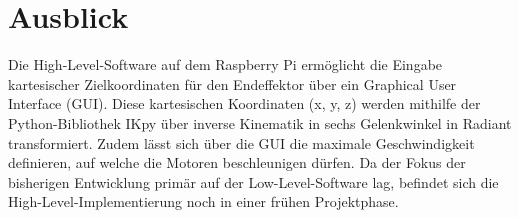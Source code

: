 \section{Ausblick}
Die High-Level-Software auf dem Raspberry Pi ermöglicht die Eingabe kartesischer Zielkoordinaten für den Endeffektor über ein Graphical User Interface (GUI). Diese kartesischen Koordinaten (x, y, z) werden mithilfe der Python-Bibliothek IKpy über inverse Kinematik in sechs Gelenkwinkel in Radiant transformiert. Zudem lässt sich über die GUI die maximale Geschwindigkeit definieren, auf welche die Motoren beschleunigen dürfen. Da der Fokus der bisherigen Entwicklung primär auf der Low-Level-Software lag, befindet sich die High-Level-Implementierung noch in einer frühen Projektphase.
%
%
%
%
%
%
%
